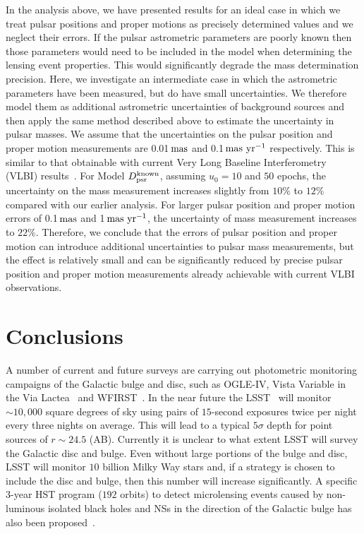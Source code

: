\documentclass[iop,apj]{emulateapj}
\begin{document}
In the analysis above, we have presented results for an ideal case in which we treat pulsar 
positions and proper motions as precisely determined values and we neglect their errors. If the 
pulsar astrometric parameters are poorly known then those parameters would need to be included in 
the model when determining the lensing event properties. This would significantly degrade the 
mass determination precision. Here, we investigate an intermediate case in which the astrometric 
parameters have been measured, but do have small uncertainties. We therefore model them as 
additional astrometric uncertainties of background sources and then apply the same method 
described above to estimate the uncertainty in pulsar masses.
%
We assume that the uncertainties on the pulsar position and proper motion measurements are 
0.01\,$\rm{mas}$ and 0.1\,$\rm{mas\ yr^{-1}}$ respectively. This is similar to that obtainable 
with current Very Long Baseline Interferometry (VLBI) results~\citep[e.g.,][]{deller}.  
%
For Model $D_{\rm{psr}}^{\rm{known}}$, assuming $u_0=10$ and $50$ epochs, the uncertainty 
on the mass measurement increases slightly from $10\%$ to $12\%$ compared with our earlier analysis.
%
For larger pulsar position and proper motion errors of 0.1\,$\rm{mas}$ and 1\,$\rm{mas\ yr^{-1}}$,
the uncertainty of mass measurement increases to $22\%$.
%
Therefore, we conclude that the errors of pulsar position and proper motion can
introduce additional uncertainties to pulsar mass measurements, 
but the effect is relatively small and can be significantly reduced by precise 
pulsar position and proper motion measurements already achievable with current VLBI observations.
%

\section{Conclusions}

A number of current and future surveys are carrying out photometric monitoring campaigns of 
the Galactic bulge and disc, such as OGLE-IV, Vista Variable in the Via Lactea~\citep{Minniti} and 
WFIRST~\citep{Spergel}. In the near future the LSST~\citep{ivez} 
will monitor $\sim 10,000$ square degrees of sky using pairs of $15$-second exposures twice per night 
every three nights on average. This will lead to a typical $5\sigma$ depth for point sources of $r\sim24.5$ (AB). 
Currently it is unclear to what extent LSST will survey the Galactic disc and bulge. Even without large portions 
of the bulge and disc, LSST will monitor $10$ billion Milky Way stars and, if a strategy is chosen to 
include the disc and bulge, then this number will increase significantly. A specific $3$-year HST program 
($192$ orbits) to detect microlensing events caused by non-luminous isolated black holes and NSs in 
the direction of the Galactic bulge has also been proposed~\citep{sahu}. 
\end{document}
